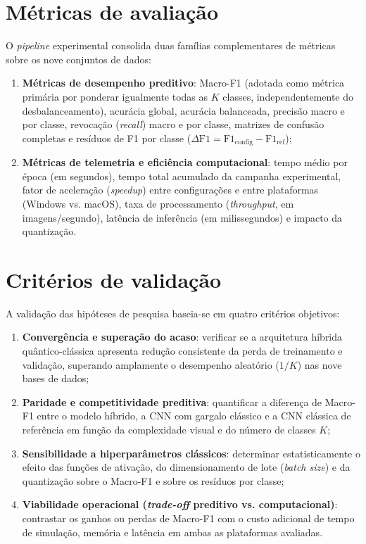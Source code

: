 \documentclass[
    12pt,
    openright,
    oneside,
    a4paper,
    english,
    brazil
]{abntex2}
\begin{document}
\section{Métricas de avaliação}
\label{subsec:funcionalidades}

O \textit{pipeline} experimental consolida duas famílias complementares de métricas sobre os nove conjuntos de dados:
\begin{enumerate}
    \item \textbf{Métricas de desempenho preditivo}: Macro-F1 (adotada como métrica primária por ponderar igualmente todas as \(K\) classes, independentemente do desbalanceamento), acurácia global, acurácia balanceada, precisão macro e por classe, revocação (\textit{recall}) macro e por classe, matrizes de confusão completas e resíduos de F1 por classe (\(\Delta\text{F1} = \text{F1}_{\text{config}} - \text{F1}_{\text{ref}}\));
    \item \textbf{Métricas de telemetria e eficiência computacional}: tempo médio por época (em segundos), tempo total acumulado da campanha experimental, fator de aceleração (\textit{speedup}) entre configurações e entre plataformas (Windows vs. macOS), taxa de processamento (\textit{throughput}, em imagens/segundo), latência de inferência (em milissegundos) e impacto da quantização.
\end{enumerate}

\section{Critérios de validação}
\label{subsec:criterios_validacao}

A validação das hipóteses de pesquisa baseia-se em quatro critérios objetivos:
\begin{enumerate}
    \item \textbf{Convergência e superação do acaso}: verificar se a arquitetura híbrida quântico-clássica apresenta redução consistente da perda de treinamento e validação, superando amplamente o desempenho aleatório (\(1/K\)) nas nove bases de dados;
    \item \textbf{Paridade e competitividade preditiva}: quantificar a diferença de Macro-F1 entre o modelo híbrido, a CNN com gargalo clássico e a CNN clássica de referência em função da complexidade visual e do número de classes \(K\);
    \item \textbf{Sensibilidade a hiperparâmetros clássicos}: determinar estatisticamente o efeito das funções de ativação, do dimensionamento de lote (\textit{batch size}) e da quantização sobre o Macro-F1 e sobre os resíduos por classe;
    \item \textbf{Viabilidade operacional (\textit{trade-off} preditivo vs. computacional)}: contrastar os ganhos ou perdas de Macro-F1 com o custo adicional de tempo de simulação, memória e latência em ambas as plataformas avaliadas.
\end{enumerate}
\end{document}

